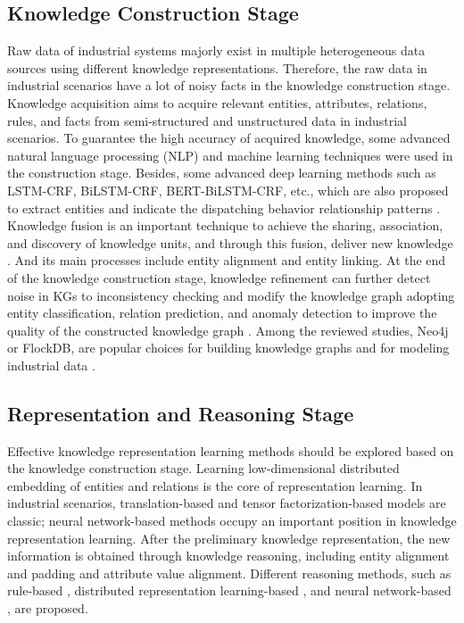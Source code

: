 \documentclass[11pt]{article}
\begin{document}
\subsection{Knowledge Construction Stage}
\par{Raw data of industrial systems majorly exist in multiple heterogeneous data sources using different knowledge representations.
Therefore, the raw data in industrial scenarios have a lot of noisy facts in the knowledge construction stage.
Knowledge acquisition aims to acquire relevant entities, attributes, relations, rules, and facts from semi-structured and unstructured data in industrial scenarios.
To guarantee the high accuracy of acquired knowledge, some advanced natural language processing (NLP) and machine learning techniques were used in the construction stage.
Besides, some advanced deep learning methods such as LSTM-CRF, BiLSTM-CRF, BERT-BiLSTM-CRF, etc., which are also proposed to extract entities and indicate the dispatching behavior relationship patterns \cite{bib13}.
Knowledge fusion is an important technique to achieve the sharing, association, and discovery of knowledge units, and through this fusion, deliver new knowledge \cite{bib14}.
And its main processes include entity alignment and entity linking.
At the end of the knowledge construction stage, knowledge refinement can further detect noise in KGs to inconsistency checking and modify the knowledge graph adopting entity classification, relation prediction, and anomaly detection to improve the quality of the constructed knowledge graph \cite{bib15}.
Among the reviewed studies, Neo4j or FlockDB, are popular choices for building knowledge graphs and for modeling industrial data \cite{bib16}.
}


\subsection{Representation and Reasoning Stage}
\par{Effective knowledge representation learning methods should be explored based on the knowledge construction stage.
Learning low-dimensional distributed embedding of entities and relations is the core of representation learning.
In industrial scenarios, translation-based \cite{bib17} and tensor factorization-based \cite{bib18} models are classic; neural network-based \cite{bib19} methods occupy an important position in knowledge representation learning.
After the preliminary knowledge representation, the new information is obtained through knowledge reasoning\cite{bibsa}, including entity alignment and padding and attribute value alignment. Different reasoning methods, such as rule-based \cite{bib20}, distributed representation learning-based \cite{bib21}, and neural network-based \cite{bib22}, are proposed.}
\end{document}
